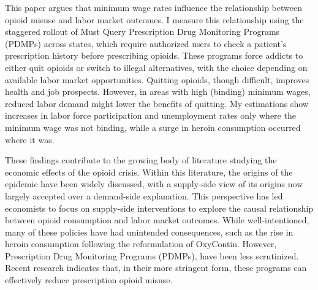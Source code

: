 \documentclass[12pt,a4paper]{article}
\begin{document}
This paper argues that minimum wage rates influence the relationship between opioid misuse and labor market outcomes.
I measure this relationship using the staggered rollout of Must Query Prescription Drug Monitoring Programs (PDMPs) across states, which require authorized users to check a patient's prescription history before prescribing opioids. 
These programs force addicts to either quit opioids or switch to illegal alternatives, with the choice depending on available labor market opportunities.
Quitting opioids, though difficult, improves health and job prospects.
However, in areas with high (binding) minimum wages, reduced labor demand might lower the benefits of quitting.
My estimations show increases in labor force participation and unemployment rates only where the minimum wage was not binding, while a surge in heroin consumption occurred where it was.



These findings contribute to the growing body of literature studying the economic effects of the opioid crisis.
Within this literature, the origins of the epidemic have been widely discussed, with a supply-side view of its origins now largely accepted over a demand-side explanation.
This perspective has led economists to focus on supply-side interventions to explore the causal relationship between opioid consumption and labor market outcomes.
While well-intentioned, many of these policies have had unintended consequences, such as the rise in heroin consumption following the reformulation of OxyContin.
However, Prescription Drug Monitoring Programs (PDMPs), have been less scrutinized.
Recent research indicates that, in their more stringent form, these programs can effectively reduce prescription opioid misuse.

\begin{comment}
    These findings contribute to the growing body of literature studying the economic effects of the opioid crisis and of the policies implemented to curb it.
    Within this literature, the origins of the epidemic have been widely discussed, with a supply-side view of its origins now largely accepted over a demand-side explanation.
    This perspective has led economists to focus on supply-side interventions to explore the causal relationship between opioid consumption and labor market outcomes.
    Prescription Drug Monitoring Programs (PDMPs) 
    Recent research indicates that, in their more stringent form, these programs can effectively reduce prescription opioid misuse.
\end{comment}
\end{document}
